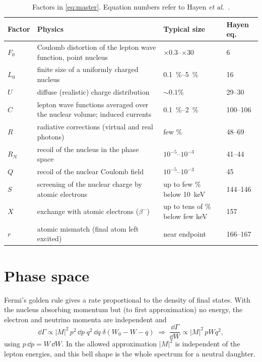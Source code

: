 \begin{table}[t]
\centering\small
\begin{tabularx}{\linewidth}{@{}l>{\raggedright}X l l@{}}
\toprule
Factor & Physics & Typical size & Hayen eq.\\
\midrule
$F_0$ & Coulomb distortion of the lepton wave function, point nucleus & $\times0.3$--$\times30$ & 6\\
$L_0$ & finite size of a uniformly charged nucleus & \SIrange{0.1}{5}{\%} & 16\\
$U$ & diffuse (realistic) charge distribution & ${\sim}0.1\%$ & 29--30\\
$C$ & lepton wave functions averaged over the nuclear volume; induced currents & \SIrange{0.1}{2}{\%} & 100--106\\
$R$ & radiative corrections (virtual and real photons) & few \% & 48--69\\
$R_N$ & recoil of the nucleus in the phase space & $10^{-5}$--$10^{-3}$ & 41--44\\
$Q$ & recoil of the nuclear Coulomb field & $10^{-5}$--$10^{-3}$ & 45\\
$S$ & screening of the nuclear charge by atomic electrons & up to few \% below \SI{10}{keV} & 144--146\\
$X$ & exchange with atomic electrons ($\beta^-$) & up to tens of \% below few keV & 157\\
$r$ & atomic mismatch (final atom left excited) & near endpoint & 166--167\\
\bottomrule
\end{tabularx}
\caption{Factors in \cref{eq:master}. Equation numbers refer to Hayen \emph{et al.}\ \cite{hayen}.}
\label{tab:terms}
\end{table}

\section{Phase space}
Fermi's golden rule gives a rate proportional to the density of final states. With the nucleus absorbing momentum but (to first approximation) no energy, the electron and neutrino momenta are independent and
\begin{equation}
\dd\Gamma \propto |M|^2\, p^2\,\dd p\; q^2\,\dd q\;\delta(W_0 - W - q)
\;\Longrightarrow\;
\frac{\dd\Gamma}{\dd W} \propto |M|^2\, p W q^2,
\end{equation}
using $p\,\dd p = W\,\dd W$. In the allowed approximation $|M|^2$ is independent of the lepton energies, and this bell shape is the whole spectrum for a neutral daughter.

